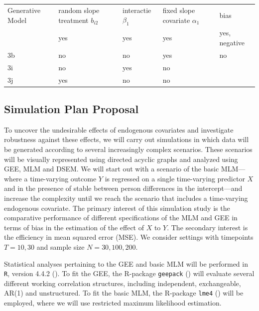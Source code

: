 \documentclass[
  12pt,
  a4paper,
]{article}
\begin{document}
\begin{longtable}[]{@{}
  >{\raggedright\arraybackslash}p{}
  >{\raggedright\arraybackslash}p{}
  >{\raggedright\arraybackslash}p{}
  >{\raggedright\arraybackslash}p{}
  >{\raggedright\arraybackslash}p{}@{}}
\toprule\noalign{}
\endhead
\bottomrule\noalign{}
\endlastfoot
Generative Model & random slope treatment \(b_{i2}\) & interactie
\(\beta_1\) & fixed slope covariate \(\alpha_1\) & bias \\
3 & yes & yes & yes & yes, negative \\
3b & no & no & yes & no \\
3i & no & yes & no & \\
3j & yes & no & no & \\
\end{longtable}

\subsection{Simulation Plan Proposal}\label{simulation-plan-proposal}

To uncover the undesirable effects of endogenous covariates and
investigate robustness against these effects, we will carry out
simulations in which data will be generated according to several
increasingly complex scenarios. These scenarios will be visually
represented using directed acyclic graphs and analyzed using GEE, MLM
and DSEM. We will start out with a scenario of the basic MLM---where a
time-varying outcome \(Y\) is regressed on a single time-varying
predictor \(X\) and in the presence of stable between person differences
in the intercept---and increase the complexity until we reach the
scenario that includes a time-varying endogenous covariate. The primary
interest of this simulation study is the comparative performance of
different specifications of the MLM and GEE in terms of bias in the
estimation of the effect of \(X\) to \(Y\). The secondary interest is
the efficiency in mean squared error (MSE). We consider settings with
timepoints \(T = 10,30\) and sample size \(N = 30, 100, 200\).

Statistical analyses pertaining to the GEE and basic MLM will be
performed in \texttt{R}, version 4.4.2
(). To fit the GEE,
the R-package \texttt{geepack} () will evaluate several different working correlation
structures, including independent, exchangeable, AR(1) and unstructured.
To fit the basic MLM, the R-package \texttt{lme4}
() will be employed, where
we will use restricted maximum likelihood estimation.
\end{document}
